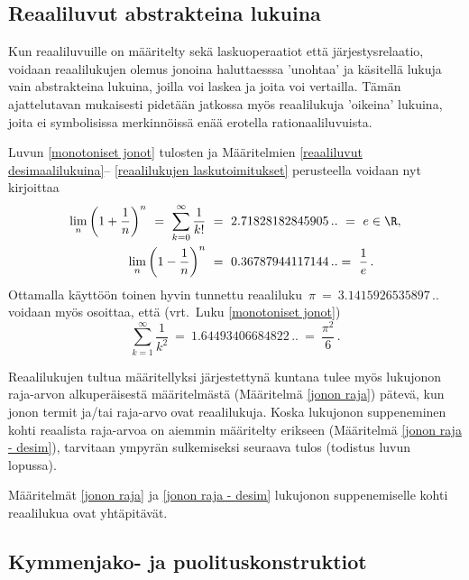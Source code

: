 \subsection*{Reaaliluvut abstrakteina lukuina}

Kun reaaliluvuille on määritelty sekä laskuoperaatiot että järjestysrelaatio, voidaan 
reaalilukujen olemus jonoina haluttaesssa 'unohtaa' ja käsitellä lukuja vain abstrakteina 
lukuina, joilla voi laskea ja joita voi vertailla. Tämän ajattelutavan mukaisesti pidetään
jatkossa myös reaalilukuja 'oikeina' lukuina, joita ei symbolisissa merkinnöissä enää
erotella rationaaliluvuista. 
\begin{Exa} \label{kertausesimerkkejä} Luvun \ref{monotoniset jonot} tulosten ja 
Määritelmien \ref{reaaliluvut desimaalilukuina}-- \ref{reaalilukujen laskutoimitukset}
perusteella voidaan nyt kirjoittaa
\begin{align*}
\lim_n \left(1 + \dfrac{1}{n}\right)^n\ =\ \sum_{k=0}^\infty \frac{1}{k!}\    
                                           &= \ 2.71828182845905\,..\ = \ e\in\R, \\ 
\lim_n \left(1 - \dfrac{1}{n}\right)^n\    &= \ 0.36787944117144\,..  = \ \frac{1}{e}\,.
\end{align*}
Ottamalla käyttöön toinen hyvin tunnettu reaaliluku $\,\pi\ =\ 3.1415926535897\,..$ voidaan
myös osoittaa, että (vrt.\ Luku \ref{monotoniset jonot})
\[
\sum_{k=1}^\infty \dfrac{1}{k^2}\ = \ 1.64493406684822\,..\ = \ \frac{\pi^2}{6}\,.
\]
\end{Exa}
Reaalilukujen tultua määritellyksi järjestettynä kuntana tulee myös lukujonon raja-arvon 
alkuperäisestä määritelmästä (Määritelmä \ref{jonon raja}) pätevä, kun jonon termit ja/tai 
raja-arvo ovat reaalilukuja. Koska lukujonon suppeneminen kohti reaalista raja-arvoa on
aiemmin määritelty erikseen (Määritelmä \ref{jonon raja - desim}), tarvitaan ympyrän
sulkemiseksi seuraava tulos (todistus luvun lopussa).
\begin{*Lause} \label{suppeneminen kohti reaalilukua} Määritelmät \ref{jonon raja} ja 
\ref{jonon raja - desim} lukujonon suppenemiselle kohti reaalilukua ovat yhtäpitävät. 
\end{*Lause}

\subsection*{Kymmenjako- ja puolituskonstruktiot}

